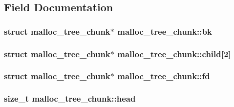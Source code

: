 \subsection{Field Documentation}
\subsubsection[{\texorpdfstring{bk}{bk}}]{\setlength{\rightskip}{0pt plus 5cm}struct {\bf malloc\+\_\+tree\+\_\+chunk}$\ast$ malloc\+\_\+tree\+\_\+chunk\+::bk}\hypertarget{structmalloc__tree__chunk_a862e6cafa961c1f63d4b10d67480cba0}{}\label{structmalloc__tree__chunk_a862e6cafa961c1f63d4b10d67480cba0}
\subsubsection[{\texorpdfstring{child}{child}}]{\setlength{\rightskip}{0pt plus 5cm}struct {\bf malloc\+\_\+tree\+\_\+chunk}$\ast$ malloc\+\_\+tree\+\_\+chunk\+::child\mbox{[}2\mbox{]}}\hypertarget{structmalloc__tree__chunk_a560fa0afc644c1e05f4fab62818ab6cd}{}\label{structmalloc__tree__chunk_a560fa0afc644c1e05f4fab62818ab6cd}
\subsubsection[{\texorpdfstring{fd}{fd}}]{\setlength{\rightskip}{0pt plus 5cm}struct {\bf malloc\+\_\+tree\+\_\+chunk}$\ast$ malloc\+\_\+tree\+\_\+chunk\+::fd}\hypertarget{structmalloc__tree__chunk_a5584ad2f70ef7ad1a5eb5f55820e3fe9}{}\label{structmalloc__tree__chunk_a5584ad2f70ef7ad1a5eb5f55820e3fe9}
\subsubsection[{\texorpdfstring{head}{head}}]{\setlength{\rightskip}{0pt plus 5cm}size\+\_\+t malloc\+\_\+tree\+\_\+chunk\+::head}\hypertarget{structmalloc__tree__chunk_a1737b1a78f4bfbf0047210e3f3fd014d}{}\label{structmalloc__tree__chunk_a1737b1a78f4bfbf0047210e3f3fd014d}
